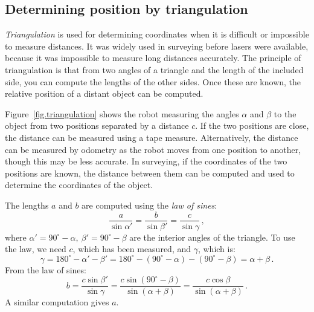 \subsection{Determining position by triangulation}

\emph{Triangulation} is used for determining coordinates when it is difficult or impossible to measure distances. It was widely used in surveying before lasers were available, because it was impossible to measure long distances accurately. The principle of triangulation is that from two angles of a triangle and the length of the included side, you can compute the lengths of the other sides. Once these are known, the relative position of a distant object can be computed.

Figure~\ref{fig.triangulation} shows the robot measuring the angles $\alpha$ and $\beta$ to the object from two positions separated by a distance $c$. If the two positions are close, the distance can be measured using a tape measure. Alternatively, the distance can be measured by odometry as the robot moves from one position to another, though this may be less accurate. In surveying, if the coordinates of the two positions are known, the distance between them can be computed and used to determine the coordinates of the object.

The lengths $a$ and $b$ are computed using the \emph{law of sines}:
\begin{displaymath}
\frac{a}{\sin\alpha'} = \frac{b}{\sin\beta'} = \frac{c}{\sin\gamma}\,,
\end{displaymath}
where $\alpha' = 90^{\circ} - \alpha, \: \beta' = 90^{\circ} - \beta$ are the interior angles of the triangle. To use the law, we need $c$, which has been measured, and $\gamma$, which is:
\begin{displaymath}
\gamma = 180^{\circ}-\alpha'-\beta' = 180^{\circ} - (90^{\circ} -
\alpha) - (90^{\circ} - \beta) = \alpha + \beta\,.
\end{displaymath}
From the law of sines:
\begin{displaymath}
b = \frac{c\sin\beta'}{\sin\gamma} =
\frac{c\sin (90^{\circ} - \beta)}{\sin (\alpha + \beta)} =
\frac{c\cos\beta}{\sin (\alpha + \beta)}\,.
\end{displaymath}
A similar computation gives $a$.

